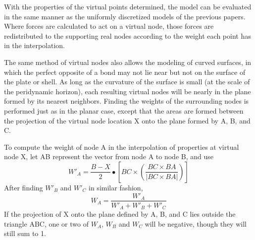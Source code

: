 With the properties of the virtual points determined, the model can be evaluated in the same manner as the uniformly discretized models of the previous papers.
Where forces are calculated to act on a virtual node, those forces are redistributed to the supporting real nodes according to the weight each point has in the interpolation.

The same method of virtual nodes also allows the modeling of curved surfaces, in which the perfect opposite of a bond may not lie near but not on the surface of the plate or shell.
As long as the curvature of the surface is small (at the scale of the peridynamic horizon), each resulting virtual nodes will be nearly in the plane formed by its nearest neighbors.
Finding the weights of the surrounding nodes is performed just as in the planar case, except that the areas are formed between the projection of the virtual node location X onto the plane formed by A, B, and C.

%  

To compute the weight of node A in the interpolation of properties at virtual node X, let AB represent the vector from node A to node B, and use
%
\begin{equation}
\label{eq:BarycentricArea}
W'_A = \frac{B-X}{2}\bullet \left[BC \times \left(\frac{BC \times BA}{|BC \times BA|}\right)\right]
\end{equation}
%
After finding $W'_B$ and $W'_C$ in similar fashion,
%
\begin{equation}
\label{eq:BarycentricWeight}
W_A = \frac{W'_A }{W'_A + W'_B + W'_C}
\end{equation}
%
If the projection of X onto the plane defined by A, B, and C lies outside the triangle ABC,  one or two of $W_A$, $W_B$ and $W_C$ will be negative, though they will still sum to 1.

